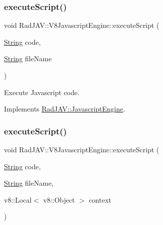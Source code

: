 \mbox{\label{class_rad_j_a_v_1_1_v8_javascript_engine_ac45d45c9a25fe8f0f9e90fe21e8ef035}} 
\subsubsection{\texorpdfstring{execute\+Script()}{executeScript()}\hspace{0.1cm}{\footnotesize\ttfamily [1/2]}}
{\footnotesize\ttfamily void Rad\+J\+A\+V\+::\+V8\+Javascript\+Engine\+::execute\+Script (\begin{DoxyParamCaption}\item[{\mbox{\hyperlink{class_rad_j_a_v_1_1_string}{String}}}]{code,  }\item[{\mbox{\hyperlink{class_rad_j_a_v_1_1_string}{String}}}]{file\+Name }\end{DoxyParamCaption})\hspace{0.3cm}{\ttfamily [virtual]}}



Execute Javascript code. 



Implements \mbox{\hyperlink{class_rad_j_a_v_1_1_javascript_engine_a4cdc81e5c398f7f1a2ce3ff45f135792}{Rad\+J\+A\+V\+::\+Javascript\+Engine}}.

\mbox{\label{class_rad_j_a_v_1_1_v8_javascript_engine_a6b6b18af2efefb9c3025310f02ab9596}} 
\subsubsection{\texorpdfstring{execute\+Script()}{executeScript()}\hspace{0.1cm}{\footnotesize\ttfamily [2/2]}}
{\footnotesize\ttfamily void Rad\+J\+A\+V\+::\+V8\+Javascript\+Engine\+::execute\+Script (\begin{DoxyParamCaption}\item[{\mbox{\hyperlink{class_rad_j_a_v_1_1_string}{String}}}]{code,  }\item[{\mbox{\hyperlink{class_rad_j_a_v_1_1_string}{String}}}]{file\+Name,  }\item[{v8\+::\+Local$<$ v8\+::\+Object $>$}]{context }\end{DoxyParamCaption})}




